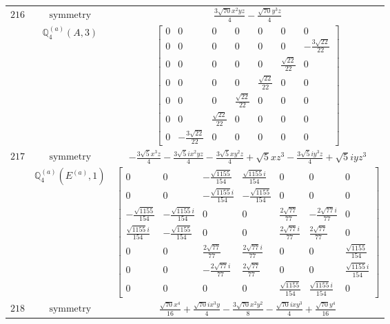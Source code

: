 \documentclass[fleqn,8pt,landscape]{jsarticle}
\begin{document}
\begin{longtable}{ccc}
$ 216 $ & $ \text{symmetry} $ & $ \frac{3 \sqrt{70} x^{2} y z}{4} - \frac{\sqrt{70} y^{3} z}{4} $ \\
$  $ & $ \mathbb{Q}_{4}^{(a)}(A,3) $ & $ \begin{bmatrix} 0 & 0 & 0 & 0 & 0 & 0 & 0 \\ 0 & 0 & 0 & 0 & 0 & 0 & - \frac{3 \sqrt{22}}{22} \\ 0 & 0 & 0 & 0 & 0 & \frac{\sqrt{22}}{22} & 0 \\ 0 & 0 & 0 & 0 & \frac{\sqrt{22}}{22} & 0 & 0 \\ 0 & 0 & 0 & \frac{\sqrt{22}}{22} & 0 & 0 & 0 \\ 0 & 0 & \frac{\sqrt{22}}{22} & 0 & 0 & 0 & 0 \\ 0 & - \frac{3 \sqrt{22}}{22} & 0 & 0 & 0 & 0 & 0 \end{bmatrix} $ \\ \hline
$ 217 $ & $ \text{symmetry} $ & $ - \frac{3 \sqrt{5} x^{3} z}{4} - \frac{3 \sqrt{5} i x^{2} y z}{4} - \frac{3 \sqrt{5} x y^{2} z}{4} + \sqrt{5} x z^{3} - \frac{3 \sqrt{5} i y^{3} z}{4} + \sqrt{5} i y z^{3} $ \\
$  $ & $ \mathbb{Q}_{4}^{(a)}(E^{(a)},1) $ & $ \begin{bmatrix} 0 & 0 & - \frac{\sqrt{1155}}{154} & \frac{\sqrt{1155} i}{154} & 0 & 0 & 0 \\ 0 & 0 & - \frac{\sqrt{1155} i}{154} & - \frac{\sqrt{1155}}{154} & 0 & 0 & 0 \\ - \frac{\sqrt{1155}}{154} & - \frac{\sqrt{1155} i}{154} & 0 & 0 & \frac{2 \sqrt{77}}{77} & - \frac{2 \sqrt{77} i}{77} & 0 \\ \frac{\sqrt{1155} i}{154} & - \frac{\sqrt{1155}}{154} & 0 & 0 & \frac{2 \sqrt{77} i}{77} & \frac{2 \sqrt{77}}{77} & 0 \\ 0 & 0 & \frac{2 \sqrt{77}}{77} & \frac{2 \sqrt{77} i}{77} & 0 & 0 & \frac{\sqrt{1155}}{154} \\ 0 & 0 & - \frac{2 \sqrt{77} i}{77} & \frac{2 \sqrt{77}}{77} & 0 & 0 & \frac{\sqrt{1155} i}{154} \\ 0 & 0 & 0 & 0 & \frac{\sqrt{1155}}{154} & \frac{\sqrt{1155} i}{154} & 0 \end{bmatrix} $ \\ \hline
$ 218 $ & $ \text{symmetry} $ & $ \frac{\sqrt{70} x^{4}}{16} + \frac{\sqrt{70} i x^{3} y}{4} - \frac{3 \sqrt{70} x^{2} y^{2}}{8} - \frac{\sqrt{70} i x y^{3}}{4} + \frac{\sqrt{70} y^{4}}{16} $ \\

\end{longtable}
\end{document}
